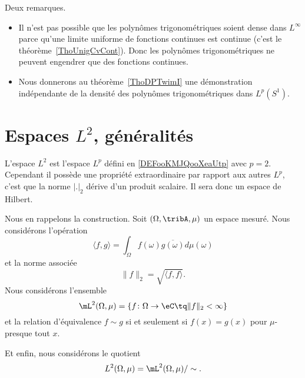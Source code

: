 \begin{remark}
	Deux remarques.
	\begin{itemize}
		\item
		      Il n'est pas possible que les polynômes trigonométriques soient dense dans \( L^{\infty}\) parce qu'une limite uniforme de fonctions continues est continue (c'est le théorème~\ref{ThoUnigCvCont}). Donc les polynômes trigonométriques ne peuvent engendrer que des fonctions continues.
		\item
		      Nous donnerons au théorème~\ref{ThoDPTwimI} une démonstration indépendante de la densité des polynômes trigonométriques dans \( L^p(S^1)\).
	\end{itemize}
\end{remark}

\section{Espaces \texorpdfstring{\( L^2\)}{\( L^2\)}, généralités}
\label{SECooEVZSooLtLhUm}

L'espace \( L^2\) est l'espace \( L^p\) défini en \ref{DEFooKMJQooXeaUtp} avec \( p=2\). Cependant il possède une propriété extraordinaire par rapport aux autres \( L^p\), c'est que la norme \( | . |_2\) dérive d'un produit scalaire. Il sera donc un espace de Hilbert.

\begin{normaltext}  \label{NORMooUEIEooYtlFse}
	Nous en rappelons la construction. Soit \( (\Omega,\tribA,\mu)\) un espace mesuré. Nous considérons l'opération
	\begin{equation}    \label{DefProdScalLubrgTj}
		\langle f, g\rangle =\int_{\Omega}f(\omega)\overline{ g(\omega)}d\mu(\omega)
	\end{equation}
	et la norme associée
	\begin{equation}
		\| f \|_2=\sqrt{\langle f, f\rangle }.
	\end{equation}
	Nous considérons l'ensemble
	\begin{equation}
		\mL^2(\Omega,\mu)=\{ f\colon \Omega\to \eC\tq \| f \|_2<\infty \}
	\end{equation}
	et la relation d'équivalence \( f\sim g\) si et seulement si \( f(x)=g(x)\) pour \( \mu\)-presque tout \( x\).

	Et enfin, nous considérons le quotient
	\begin{equation}
		L^2(\Omega,\mu)=\mL^2(\Omega,\mu)/\sim.
	\end{equation}
\end{normaltext}


